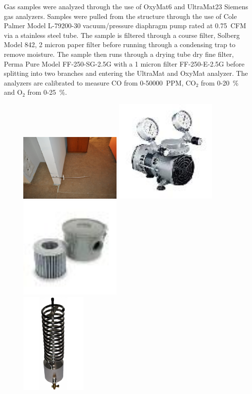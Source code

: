 \documentclass[12pt,oneside]{book}
\begin{document}
Gas samples were analyzed through the use of OxyMat6 and UltraMat23 Siemens gas analyzers. Samples were pulled from the structure through the use of Cole Palmer Model L-79200-30 vacuum/pressure diaphragm pump rated at 0.75~CFM via a stainless steel tube. The sample is filtered through a course filter, Solberg Model 842, 2 micron paper filter before running through a condensing trap to remove moisture. The sample then runs through a drying tube dry fine filter, Perma Pure Model FF-250-SG-2.5G with a 1 micron filter FF-250-E-2.5G before splitting into two branches and entering the UltraMat and OxyMat analyzer. The analyzers are calibrated to measure CO from 0-50000~PPM, CO$_2$ from 0-20~\% and O$_2$ from 0-25~\%. 

\begin{figure}[H]
	\centering
	\includegraphics[width = 2in]{0_Images/Instrumentation/Gas_Analyzer/SamplePoint.jpg}
	\includegraphics[width = 2in]{0_Images/Instrumentation/Gas_Analyzer/VaccumPump.jpg}
	\includegraphics[width = 2in]{0_Images/Instrumentation/Gas_Analyzer/CourseFilter.jpg} \\
	\includegraphics[height = 2in]{0_Images/Instrumentation/Gas_Analyzer/CoilCondenser.png} \hspace{0.1\textwidth}

\end{figure}
\end{document}

